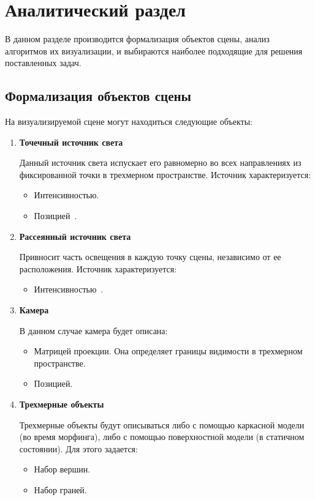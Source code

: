 \chapter{Аналитический раздел}

В данном разделе производится формализация объектов сцены, анализ алгоритмов их визуализации, и выбираются наиболее подходящие для решения поставленных задач.

\section[Формализация объектов синтезируемой сцены]{Формализация объектов сцены}
\label{sec:obj_formalasation}

На визуализируемой сцене могут находиться следующие объекты:
\begin{enumerate}
	\item \textbf{Точечный источник света}
	
	Данный источник света испускает его равномерно во всех направлениях из фиксированной точки в трехмерном пространстве.
	Источник характеризуется:
	\begin{itemize}
		\item Интенсивностью.
		\item Позицией~\cite{Gambetta}.
	\end{itemize}
	
	\item \textbf{Рассеянный источник света}
	
	Привносит часть освещения в каждую точку сцены, независимо от ее расположения. 
	Источник характеризуется:
	\begin{itemize}
		\item Интенсивностью~\cite{Gambetta}.
	\end{itemize}
	
	\item \textbf{Камера}
	
	В данном случае камера будет описана:
	\begin{itemize}
		\item Матрицей проекции. Она определяет границы видимости в трехмерном пространстве.
		\item Позицией.
	\end{itemize}
	
	\item \textbf{Трехмерные объекты}
		
	Трехмерные объекты будут описываться либо с помощью каркасной модели (во время морфинга), либо с помощью поверхностной модели (в статичном состоянии).
	Для этого задается:
	\begin{itemize}
		\item Набор вершин.
		\item Набор граней.
	\end{itemize}
\end{enumerate}


